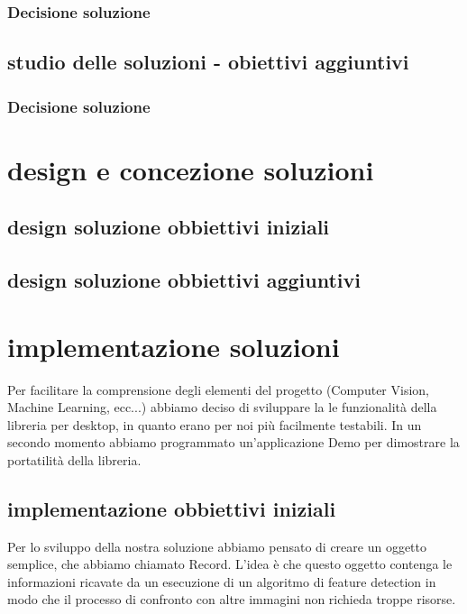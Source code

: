 \documentclass[twoside]{supsistudent}
\begin{document}
\subsection{Decisione soluzione}
\section{studio delle soluzioni - obiettivi aggiuntivi}
\subsection{Decisione soluzione }

\chapter{design e concezione soluzioni}
\section{design soluzione obbiettivi iniziali}
\section{design soluzione obbiettivi aggiuntivi}

\chapter{implementazione soluzioni}%
Per facilitare la comprensione degli elementi del progetto (Computer Vision, Machine Learning, ecc...) abbiamo deciso di sviluppare la le funzionalità della libreria per desktop, in quanto erano per noi più facilmente testabili. In un secondo momento abbiamo programmato un'applicazione Demo per dimostrare la portatilità della libreria.

\section{implementazione obbiettivi iniziali}%
Per lo sviluppo della nostra soluzione abbiamo pensato di creare un oggetto semplice, che abbiamo chiamato Record. L'idea è che questo oggetto contenga le informazioni ricavate da un esecuzione di un algoritmo di feature detection in modo che il processo di confronto con altre immagini non richieda troppe risorse. 
\end{document}
